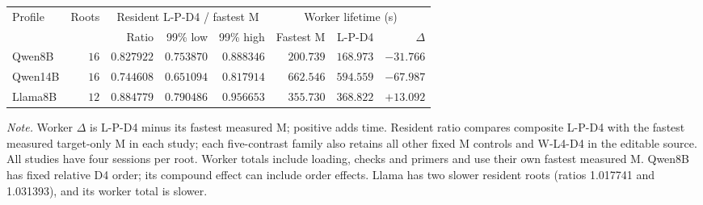\begingroup
\fontsize{8.5}{10.5}\selectfont
\setlength{\tabcolsep}{2.6pt}\renewcommand{\arraystretch}{1.03}
\noindent
\begin{tabularx}{\linewidth}{@{}>{\raggedright\arraybackslash}Xrrrrrrr@{}}
\toprule
Profile & Roots & \multicolumn{3}{c}{Resident L-P-D4 / fastest M} & \multicolumn{3}{c}{Worker lifetime (s)}\\
\cmidrule(lr){3-5}\cmidrule(lr){6-8}
 &  & Ratio & 99\% low & 99\% high & Fastest M & L-P-D4 & $\Delta$\\
\midrule
Qwen8B & $16$ & $0.827922$ & $0.753870$ & $0.888346$ & $200.739$ & $168.973$ & $-31.766$\\
Qwen14B & $16$ & $0.744608$ & $0.651094$ & $0.817914$ & $662.546$ & $594.559$ & $-67.987$\\
Llama8B & $12$ & $0.884779$ & $0.790486$ & $0.956653$ & $355.730$ & $368.822$ & $+13.092$\\
\bottomrule
\end{tabularx}
\par\smallskip
\fontsize{8}{9.6}\selectfont\raggedright
\textit{Note.} Worker $\Delta$ is L-P-D4 minus its fastest measured M; positive adds time. Resident ratio compares composite L-P-D4 with the fastest measured target-only M in each study; each five-contrast family also retains all other fixed M controls and W-L4-D4 in the editable source. All studies have four sessions per root. Worker totals include loading, checks and primers and use their own fastest measured M. Qwen8B has fixed relative D4 order; its compound effect can include order effects. Llama has two slower resident roots (ratios 1.017741 and 1.031393), and its worker total is slower.
\par\endgroup
